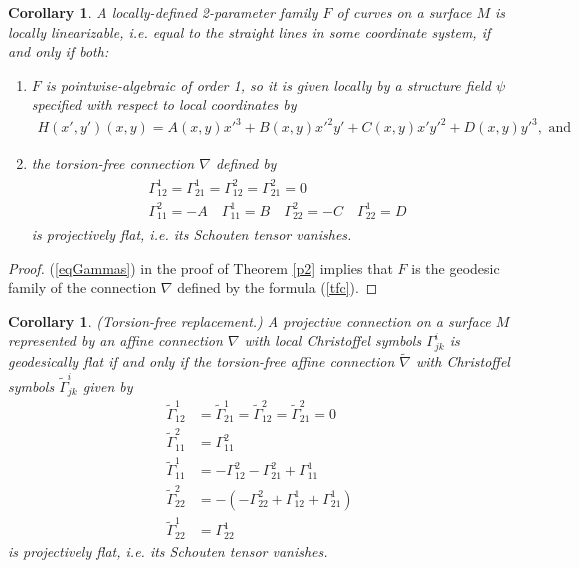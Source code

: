 \documentclass[12pt]{article}
\numberwithin{equation}{section}
\theoremstyle{plain}
\newtheorem{corollary}[definition]{Corollary}
\theoremstyle{definition}
\begin{document}
\begin{corollary}\label{gengf} A locally-defined 2-parameter family $F$ of curves on a surface $M$ is locally linearizable, i.e. equal to the straight lines in some coordinate system, if and only if both:
\begin{enumerate}
\itemsep0em
\item{$F$ is pointwise-algebraic of order 1, so it is given locally by a structure field $\psi$ specified with respect to local coordinates by
\begin{align*}
H(x',y')(x,y)=A(x,y)x'^{3}+B(x,y)x'^{2}y'+C(x,y)x'y'^{2}+D(x,y)y'^{3}, \text{ and}
\end{align*}}
\item{the torsion-free connection $\nabla$ defined by
\begin{align}\label{tfc}
\begin{split}
&\Gamma^{1}_{12}=\Gamma^{1}_{21}=\Gamma^{2}_{12}=\Gamma^{2}_{21}=0\\
&\Gamma^{2}_{11}=-A\quad \Gamma^{1}_{11}=B\quad\Gamma^{2}_{22}=-C\quad \Gamma^{1}_{22}=D
\end{split}
\end{align}
is projectively flat, i.e. its Schouten tensor vanishes.}
\end{enumerate}
\end{corollary}
\begin{proof} (\ref{eqGammas}) in the proof of Theorem \ref{p2} implies that $F$ is the geodesic family of the connection $\nabla$ defined by the formula (\ref{tfc}).
\end{proof}

\begin{corollary}\label{gf}\emph{(Torsion-free replacement.)} A projective connection on a surface $M$ represented by an affine connection $\nabla$ with local Christoffel symbols $\Gamma^{i}_{jk}$ is geodesically flat if and only if the torsion-free affine connection $\tilde{\nabla}$ with Christoffel symbols $\tilde{\Gamma}^{i}_{jk}$ given by
\begin{align*}
\tilde{\Gamma}^{1}_{12}&=\tilde{\Gamma}^{1}_{21}=\tilde{\Gamma}^{2}_{12}=\tilde{\Gamma}^{2}_{21}=0\\
\tilde{\Gamma}^{2}_{11}&=\Gamma^{2}_{11}\\
\tilde{\Gamma}^{1}_{11}&=-\Gamma^{2}_{12}-\Gamma^{2}_{21} +\Gamma^{1}_{11}\\
\tilde{\Gamma}^{2}_{22}&=-(-\Gamma^{2}_{22}+\Gamma^{1}_{12} +\Gamma^{1}_{21})\\
\tilde{\Gamma}^{1}_{22}&=\Gamma^{1}_{22}
\end{align*}
is projectively flat, i.e. its Schouten tensor vanishes.
\end{corollary}
\end{document}
